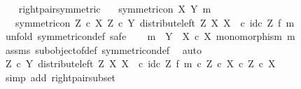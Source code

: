 \begin{isabellebody}
\ \ \isamarkupfalse%
\isanewline
{}\isamarkupfalse%
%
\endisatagproof
{\isafoldproof}%
%
\isadelimproof
\isanewline
%
\endisadelimproof
\isanewline
{}\isamarkupfalse%
\ right{\isacharunderscore}{\kern0pt}pair{\isacharunderscore}{\kern0pt}symmetric{\isacharcolon}{\kern0pt}\isanewline
\ \ \ {\isachardoublequoteopen}symmetric{\isacharunderscore}{\kern0pt}on\ X\ {\isacharparenleft}{\kern0pt}Y{\isacharcomma}{\kern0pt}\ m{\isacharparenright}{\kern0pt}{\isachardoublequoteclose}\isanewline
\ \ \ {\isachardoublequoteopen}symmetric{\isacharunderscore}{\kern0pt}on\ {\isacharparenleft}{\kern0pt}Z\ {\isasymtimes}\isactrlsub c\ X{\isacharparenright}{\kern0pt}\ {\isacharparenleft}{\kern0pt}Z\ {\isasymtimes}\isactrlsub c\ Y{\isacharcomma}{\kern0pt}\ distribute{\isacharunderscore}{\kern0pt}left\ Z\ X\ X\ \ {\isasymcirc}\isactrlsub c\ {\isacharparenleft}{\kern0pt}id\isactrlsub c\ Z\ {\isasymtimes}\isactrlsub f\ m{\isacharparenright}{\kern0pt}{\isacharparenright}{\kern0pt}{\isachardoublequoteclose}\isanewline
%
\isadelimproof
%
\endisadelimproof
%
\isatagproof
{}\isamarkupfalse%
\ {\isacharparenleft}{\kern0pt}unfold\ symmetric{\isacharunderscore}{\kern0pt}on{\isacharunderscore}{\kern0pt}def{\isacharcomma}{\kern0pt}\ safe{\isacharparenright}{\kern0pt}\isanewline
\ \ \isamarkupfalse%
\ {\isachardoublequoteopen}m\ {\isacharcolon}{\kern0pt}\ Y\ {\isasymrightarrow}\ X\ {\isasymtimes}\isactrlsub c\ X{\isachardoublequoteclose}\ {\isachardoublequoteopen}monomorphism\ m{\isachardoublequoteclose}\isanewline
\ \ \ \ \isamarkupfalse%
\ assms\ subobject{\isacharunderscore}{\kern0pt}of{\isacharunderscore}{\kern0pt}def{}\ symmetric{\isacharunderscore}{\kern0pt}on{\isacharunderscore}{\kern0pt}def\ \isamarkupfalse%
\ auto\isanewline
\ \ \isamarkupfalse%
\ \isamarkupfalse%
\ {\isachardoublequoteopen}{\isacharparenleft}{\kern0pt}Z\ {\isasymtimes}\isactrlsub c\ Y{\isacharcomma}{\kern0pt}\ distribute{\isacharunderscore}{\kern0pt}left\ Z\ X\ X\ \ {\isasymcirc}\isactrlsub c\ {\isacharparenleft}{\kern0pt}id\isactrlsub c\ Z\ {\isasymtimes}\isactrlsub f\ m{\isacharparenright}{\kern0pt}{\isacharparenright}{\kern0pt}\ {\isasymsubseteq}\isactrlsub c\ {\isacharparenleft}{\kern0pt}Z\ {\isasymtimes}\isactrlsub c\ X{\isacharparenright}{\kern0pt}\ {\isasymtimes}\isactrlsub c\ Z\ {\isasymtimes}\isactrlsub c\ X{\isachardoublequoteclose}\isanewline
\ \ \ \ \isamarkupfalse%
\ {\isacharparenleft}{\kern0pt}simp\ add{\isacharcolon}{\kern0pt}\ right{\isacharunderscore}{\kern0pt}pair{\isacharunderscore}{\kern0pt}subset{\isacharparenright}{\kern0pt}\isanewline

\end{isabellebody}
